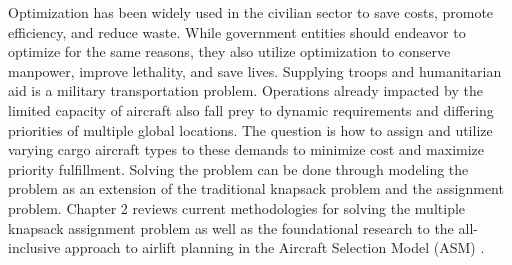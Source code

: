 Optimization has been widely used in the civilian sector to save costs, promote efficiency, and reduce waste.  While government entities should endeavor to optimize for the same reasons, they also utilize optimization to conserve manpower, improve lethality, and save lives. Supplying troops and humanitarian aid is a military transportation problem.  %
Operations already impacted by the limited capacity of aircraft also fall prey to dynamic requirements and differing priorities of multiple global locations.  The question is how to assign and utilize varying cargo aircraft types to these demands to minimize cost and maximize priority fulfillment.  %
Solving the problem can be done through modeling the problem as an extension of the traditional knapsack problem and the assignment problem.  Chapter 2 reviews current methodologies for solving the multiple knapsack assignment problem as well as the foundational research to the all-inclusive approach to airlift planning in the Aircraft Selection Model (ASM) \cite{maywald}.


